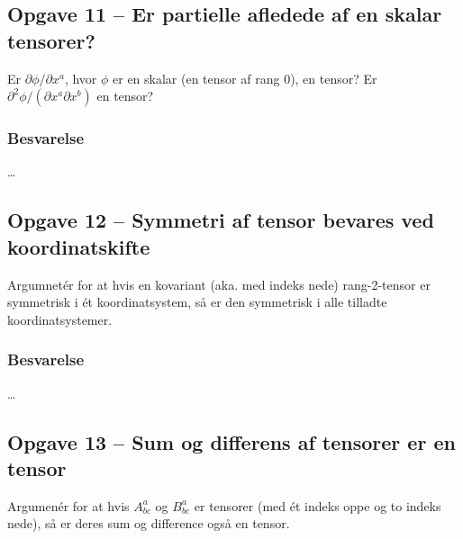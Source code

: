 \documentclass[../main.tex]{subfiles}
\begin{document}

\subsection{Opgave 11 -- Er partielle afledede af en skalar tensorer?}
\setcounter{subsection}{11}
\setcounter{equation}{0}

Er $\partial \phi / \partial x^a$, hvor $\phi$ er en skalar (en tensor af rang $0$), en tensor? Er $\partial^2 \phi / (\partial x^a \partial x^b)$ en tensor?


\subsubsection{Besvarelse}

\ldots




\subsection{Opgave 12 -- Symmetri af tensor bevares ved koordinatskifte}
\setcounter{subsection}{12}
\setcounter{equation}{0}

Argumnetér for at hvis en kovariant (aka. med indeks nede) rang-2-tensor er symmetrisk i ét koordinatsystem, så er den symmetrisk i alle tilladte koordinatsystemer.


\subsubsection{Besvarelse}

\ldots




\subsection{Opgave 13 -- Sum og differens af tensorer er en tensor}
\setcounter{subsection}{13}
\setcounter{equation}{0}

Argumenér for at hvis $A^a_{bc}$ og $B^a_{bc}$ er tensorer (med ét indeks oppe og to indeks nede), så er deres sum og difference også en tensor.
\end{document}

